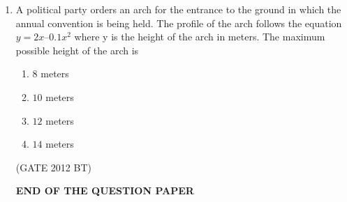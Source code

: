 \documentclass[journal,12pt,onecolumn]{IEEEtran}
\theoremstyle{remark}
\begin{document}
\begin{enumerate}
\item 	A political party orders an arch for the entrance to the ground in which the annual convention is being held. The profile of the arch follows the equation $y = 2x – 0.1x^2$ where y is the height of the arch in meters. The maximum possible height of the arch is
\begin{multicols}{4}
\begin{enumerate}
\item $8$ meters	
\item  $10$ meters	
\item  $12$ meters	
\item  $14$ meters
\end{enumerate}
\end{multicols} \hfill(GATE 2012 BT)

\centering
\textbf{END OF THE QUESTION PAPER}




\end{enumerate}
\end{document}

